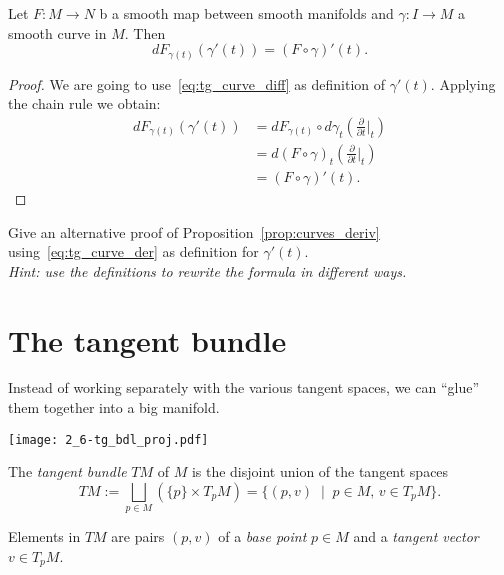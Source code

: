 \begin{proposition}\label{prop:curves_deriv}
  Let $F:M\to N$ b a smooth map between smooth manifolds and $\gamma:I\to M$ a smooth curve in $M$.
  Then
  \begin{equation}
    d F_{\gamma(t)} (\gamma'(t)) = (F\circ\gamma)'(t).
  \end{equation}
\end{proposition}
\begin{proof}
  We are going to use~\eqref{eq:tg_curve_diff} as definition of $\gamma'(t)$.
  Applying the chain rule we obtain:
  \begin{align}
    d F_{\gamma(t)} (\gamma'(t))
    &= d F_{\gamma(t)} \circ d\gamma_t\left(\frac{\partial}{\partial t}\Big|_t\right) \\
    &= d (F\circ\gamma)_t \left(\frac{\partial}{\partial t}\Big|_t\right) \\
    &= (F\circ\gamma)'(t).
  \end{align}
\end{proof}

\begin{exercise}
  Give an alternative proof of Proposition~\ref{prop:curves_deriv} using~\eqref{eq:tg_curve_der} as definition for $\gamma'(t)$.\\
 \textit{\small Hint: use the definitions to rewrite the formula in different ways.}
\end{exercise}

\section{The tangent bundle}\label{sec:tangentbundle}

Instead of working separately with the various tangent spaces, we can ``glue'' them together into a big manifold.

\begin{marginfigure}
  \texttt{[image: 2\_6-tg\_bdl\_proj.pdf]}
\end{marginfigure}
\begin{definition}
  The \emph{tangent bundle} $TM$ of $M$ is the disjoint union of the tangent spaces
  \begin{equation}
    TM := \bigsqcup_{p\in M}\left(\{p\}\times T_pM\right)
       = \{(p,v) \;\mid\; p\in M,\, v\in T_pM\}.
  \end{equation}  
\end{definition}

Elements in $TM$ are pairs $(p,v)$ of a \emph{base point} $p\in M$ and a \emph{tangent vector} $v\in T_pM$.


